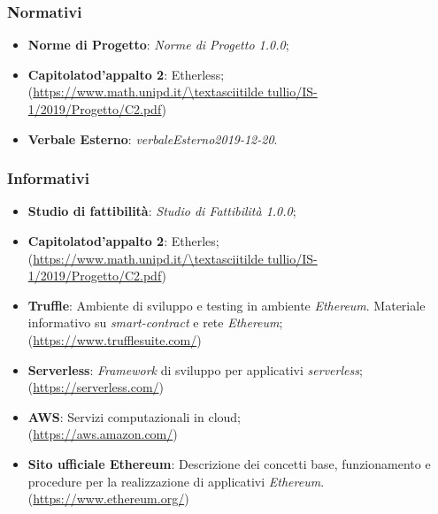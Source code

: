 \subsubsection{Normativi}
	\begin{itemize}
		\item \textbf{Norme di Progetto}: \textit{Norme di Progetto 1.0.0};
		\item \textbf{Capitolato\glo d'appalto 2}: Etherless;\\ 
			(\url{https://www.math.unipd.it/\textasciitilde tullio/IS-1/2019/Progetto/C2.pdf})
		\item \textbf{Verbale Esterno}: \textit{verbaleEsterno2019-12-20}.
	\end{itemize}
\subsubsection{Informativi}
\begin{itemize}
	\item \textbf{Studio di fattibilità}: \textit{Studio di Fattibilità 1.0.0};
    \item \textbf{Capitolato\glo d'appalto 2}: Etherles;\\ 
			(\url{https://www.math.unipd.it/\textasciitilde tullio/IS-1/2019/Progetto/C2.pdf})
	\item \textbf{Truffle}:  Ambiente di sviluppo e testing in ambiente \textit{Ethereum\glos}. Materiale informativo su \textit{smart-contract\glo} e rete \textit{Ethereum\glos};
		\\ (\url{https://www.trufflesuite.com/})
	\item \textbf{Serverless\glos}:  \textit{Framework\glo} di sviluppo per applicativi \textit{serverless\glos};\\ (\url{https://serverless.com/})
	\item \textbf{AWS}: Servizi computazionali in cloud; \\ (\url{https://aws.amazon.com/})
	\item \textbf{Sito ufficiale Ethereum\glo}: Descrizione dei concetti base, funzionamento e procedure per la realizzazione di applicativi \textit{Ethereum\glos}.
\\ (\url {https://www.ethereum.org/})
\end{itemize}

	
	
	